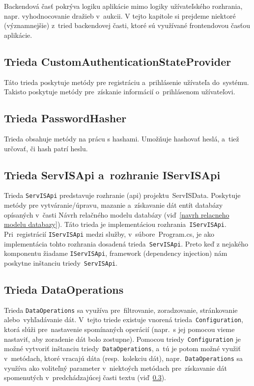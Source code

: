 Backendová časť pokrýva logiku aplikácie mimo logiky užívateľského rozhrania, napr. vyhodnocovanie dražieb v~aukcii. V tejto kapitole si prejdeme niektoré (významnejšie) z~tried backendovej časti, ktoré sú využívané frontendovou časťou aplikácie.

\subsection{Trieda CustomAuthenticationStateProvider}
\label{trieda customauthenticationstateprovider}

Táto trieda poskytuje metódy pre registráciu a~prihlásenie užívateľa do~systému. Takisto poskytuje metódy pre~získanie informácií o~prihlásenom užívateľovi.

\subsection{Trieda PasswordHasher}
\label{trieda passwordhasher}

Trieda obsahuje metódy na prácu s hashami. Umožňuje hashovať heslá, a~tiež určovať, či hash patrí heslu.

\subsection{Trieda ServISApi a~rozhranie IServISApi}
\label{trieda servisapi a rozhranie iservisapi}

Trieda \verb|ServISApi| predstavuje rozhranie (api) projektu~ServISData. Poskytuje metódy pre vytváranie/úpravu, mazanie a~získavanie dát entít databázy opísaných v~časti Návrh relačného modelu databázy (viď~\ref{navrh relacneho modelu databazy}). Táto trieda je implementáciou rozhrania~\verb|IServISApi|. Pri~registrácií \verb|IServISApi| medzi služby, v~súbore~Program.cs, je ako implementácia tohto rozhrania dosadená trieda~\verb|ServISApi|. Preto keď z nejakého komponentu žiadame \verb|IServISApi|, framework (dependency injection) nám poskytne inštanciu triedy~\verb|ServISApi|.

\subsection{Trieda DataOperations}
\label{trieda dataoperations}

Trieda \verb|DataOperations| sa využíva pre~filtrovanie, zoradzovanie, stránkovanie alebo~vyhľadávanie dát. V~tejto triede existuje vnorená trieda~\verb|Configuration|, ktorá slúži pre~nastavenie spomínaných operácií (napr.~s jej pomocou vieme nastaviť, aby zoradenie dát bolo zostupne). Pomocou triedy~\verb|Configuration| je možné vytvoriť inštanciu triedy~\verb|DataOperations|, a~tú je potom možné využiť v~metódach, ktoré vracajú dáta (resp.~kolekciu dát), napr.~\verb|DataOperations| sa využíva ako voliteľný parameter v~niektoých metódach pre~získavanie dát spomenutých v~predchádzajúcej časti textu (viď~\ref{trieda servisapi a rozhranie iservisapi}).


